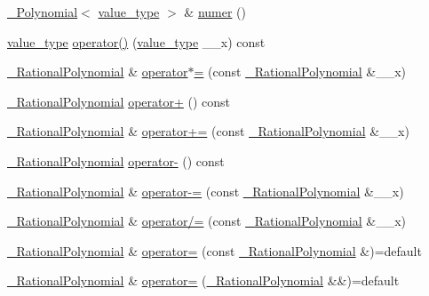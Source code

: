 \begin{DoxyCompactItemize}
\item 
\hyperlink{class____gnu__cxx_1_1__Polynomial}{\+\_\+\+Polynomial}$<$ \hyperlink{class____gnu__cxx_1_1__RationalPolynomial_adeec7f1bec03111031599f337848ee8b}{value\+\_\+type} $>$ \& \hyperlink{class____gnu__cxx_1_1__RationalPolynomial_ab672b7b5adc77e5937611ea20c9e68b0}{numer} ()
\item 
\hyperlink{class____gnu__cxx_1_1__RationalPolynomial_adeec7f1bec03111031599f337848ee8b}{value\+\_\+type} \hyperlink{class____gnu__cxx_1_1__RationalPolynomial_a964bc37a8932003c8ecd45da84512b2d}{operator()} (\hyperlink{class____gnu__cxx_1_1__RationalPolynomial_adeec7f1bec03111031599f337848ee8b}{value\+\_\+type} \+\_\+\+\_\+x) const
\item 
\hyperlink{class____gnu__cxx_1_1__RationalPolynomial}{\+\_\+\+Rational\+Polynomial} \& \hyperlink{class____gnu__cxx_1_1__RationalPolynomial_a3905ba0616e848fb7daa18dd01481b78}{operator$\ast$=} (const \hyperlink{class____gnu__cxx_1_1__RationalPolynomial}{\+\_\+\+Rational\+Polynomial} \&\+\_\+\+\_\+x)
\item 
\hyperlink{class____gnu__cxx_1_1__RationalPolynomial}{\+\_\+\+Rational\+Polynomial} \hyperlink{class____gnu__cxx_1_1__RationalPolynomial_af027ee02f3bcd373e420eacec639a596}{operator+} () const
\item 
\hyperlink{class____gnu__cxx_1_1__RationalPolynomial}{\+\_\+\+Rational\+Polynomial} \& \hyperlink{class____gnu__cxx_1_1__RationalPolynomial_a04b822ad014e4c38bcaf609b48176c13}{operator+=} (const \hyperlink{class____gnu__cxx_1_1__RationalPolynomial}{\+\_\+\+Rational\+Polynomial} \&\+\_\+\+\_\+x)
\item 
\hyperlink{class____gnu__cxx_1_1__RationalPolynomial}{\+\_\+\+Rational\+Polynomial} \hyperlink{class____gnu__cxx_1_1__RationalPolynomial_a21c445f37dbceb2832ab1eebf5d2d965}{operator-\/} () const
\item 
\hyperlink{class____gnu__cxx_1_1__RationalPolynomial}{\+\_\+\+Rational\+Polynomial} \& \hyperlink{class____gnu__cxx_1_1__RationalPolynomial_ad233308f7f97d2658486b5eae84f90a5}{operator-\/=} (const \hyperlink{class____gnu__cxx_1_1__RationalPolynomial}{\+\_\+\+Rational\+Polynomial} \&\+\_\+\+\_\+x)
\item 
\hyperlink{class____gnu__cxx_1_1__RationalPolynomial}{\+\_\+\+Rational\+Polynomial} \& \hyperlink{class____gnu__cxx_1_1__RationalPolynomial_aa730392e9487843aad01fb28328ce032}{operator/=} (const \hyperlink{class____gnu__cxx_1_1__RationalPolynomial}{\+\_\+\+Rational\+Polynomial} \&\+\_\+\+\_\+x)
\item 
\hyperlink{class____gnu__cxx_1_1__RationalPolynomial}{\+\_\+\+Rational\+Polynomial} \& \hyperlink{class____gnu__cxx_1_1__RationalPolynomial_afa1efd00dfffcf6851bac3da7ba399dc}{operator=} (const \hyperlink{class____gnu__cxx_1_1__RationalPolynomial}{\+\_\+\+Rational\+Polynomial} \&)=default
\item 
\hyperlink{class____gnu__cxx_1_1__RationalPolynomial}{\+\_\+\+Rational\+Polynomial} \& \hyperlink{class____gnu__cxx_1_1__RationalPolynomial_a8013626cc835738ce3dda59d59dfbee8}{operator=} (\hyperlink{class____gnu__cxx_1_1__RationalPolynomial}{\+\_\+\+Rational\+Polynomial} \&\&)=default
\end{DoxyCompactItemize}


